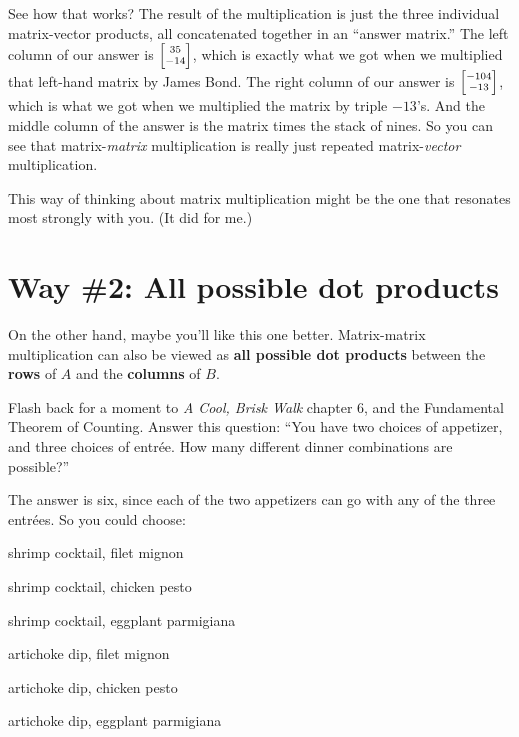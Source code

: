 See how that works? The result of the multiplication is just the three
individual matrix-vector products, all concatenated together in an ``answer
matrix.'' The left column of our answer is ${\scriptsize \begin{bmatrix} 35 \\
-14 \\ \end{bmatrix}}$, which is exactly what we got when we multiplied that
left-hand matrix by James Bond. The right column of our answer is ${\scriptsize
\begin{bmatrix} -104 \\ -13 \\ \end{bmatrix}}$, which is what we got when we
multiplied the matrix by triple $-13$'s. And the middle column of the answer is
the matrix times the stack of nines. So you can see that matrix-\textit{matrix}
multiplication is really just repeated matrix-\textit{vector} multiplication.

This way of thinking about matrix multiplication might be the one that
resonates most strongly with you. (It did for me.)

\section{Way \#2: All possible dot products}

On the other hand, maybe you'll like this one better. Matrix-matrix
multiplication can also be viewed as \textbf{all possible dot products} between
the \textbf{rows} of $A$ and the \textbf{columns} of $B$.

Flash back for a moment to \textit{A Cool, Brisk Walk} chapter 6, and the
Fundamental Theorem of Counting. Answer this question: ``You have two choices
of appetizer, and three choices of entr\'{e}e. How many different dinner
combinations are possible?''

The answer is six, since each of the two appetizers can go with any of the
three entr\'{e}es. So you could choose:

\begin{compactenum}
\item shrimp cocktail, filet mignon
\item shrimp cocktail, chicken pesto
\item shrimp cocktail, eggplant parmigiana
\item artichoke dip, filet mignon
\item artichoke dip, chicken pesto
\item artichoke dip, eggplant parmigiana
\end{compactenum}

